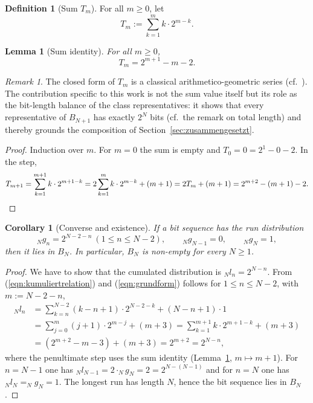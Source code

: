 \documentclass[11pt,a4paper]{scrartcl}
\theoremstyle{plain}
\newtheorem{lemma}[satz]{Lemma}
\newtheorem{korollar}[satz]{Corollary}
\theoremstyle{definition}
\newtheorem{defi}[satz]{Definition}
\theoremstyle{remark}
\newtheorem{bem}[satz]{Remark}
\begin{document}
\begin{defi}[Sum $T_m$]\label{defi:summenidentitaet}
For all $m\geq 0$, let
\begin{equation}\label{eqn:summenidentitaet}
  T_m:=\sum_{k=1}^{m} k\cdot 2^{m-k}.
\end{equation}
\end{defi}

\begin{lemma}[Sum identity]\label{lem:summenidentitaet}
For all $m\geq 0$,
\begin{equation}\label{eqn:summenwert}
  T_m=2^{m+1}-m-2.
\end{equation}
\end{lemma}

\begin{bem}
The closed form of $T_m$ is a classical arithmetico-geometric series
(cf.~\cite{knuth1997}). The contribution specific to this work is not
the sum value itself but its role as the bit-length balance of the
class representatives: it shows that every representative of $B_{N+1}$
has exactly $2^{N}$ bits (cf.~the remark on total length) and thereby
grounds the composition of Section~\ref{sec:zusammengesetzt}.
\end{bem}

\begin{proof}
Induction over $m$. For $m=0$ the sum is empty and
$T_0=0=2^{1}-0-2$. In the step,
\begin{equation*}
  T_{m+1}=\sum_{k=1}^{m+1}k\cdot 2^{m+1-k}
  =2\sum_{k=1}^{m}k\cdot 2^{m-k}+(m+1)
  =2T_m+(m+1)
  =2^{m+2}-(m+1)-2.\qedhere
\end{equation*}
\end{proof}

\begin{korollar}[Converse and existence]\label{kor:umkehrung}
If a bit sequence has the run distribution
\begin{equation}\label{eqn:grundform}
  _Ng_n=2^{N-2-n}\ (1\leq n\leq N-2),\qquad _Ng_{N-1}=0,\qquad _Ng_N=1,
\end{equation}
then it lies in $B_N$. In particular, $B_N$ is non-empty for every
$N\geq 1$.
\end{korollar}

\begin{proof}
We have to show that the cumulated distribution is $_Nl_n=2^{N-n}$.
From (\ref{eqn:kumuliertrelation}) and (\ref{eqn:grundform}) follows
for $1\leq n\leq N-2$, with $m:=N-2-n$,
\begin{align*}
  _Nl_n&=\sum_{k=n}^{N-2}\left(k-n+1\right)\cdot 2^{N-2-k}
  +\left(N-n+1\right)\cdot 1\\
  &=\sum_{j=0}^{m}\left(j+1\right)\cdot 2^{m-j}+\left(m+3\right)
  =\sum_{k=1}^{m+1} k\cdot 2^{m+1-k}+\left(m+3\right)\\
  &=\left(2^{m+2}-m-3\right)+\left(m+3\right)=2^{m+2}=2^{N-n},
\end{align*}
where the penultimate step uses the sum identity
(Lemma~\ref{lem:summenidentitaet}, $m\mapsto m+1$). For $n=N-1$ one
has $_Nl_{N-1}=2\cdot _Ng_N=2=2^{N-(N-1)}$ and for $n=N$ one has
$_Nl_N=_Ng_N=1$. The longest run has length $N$, hence the bit
sequence lies in $B_N$.
\end{proof}
\end{document}
